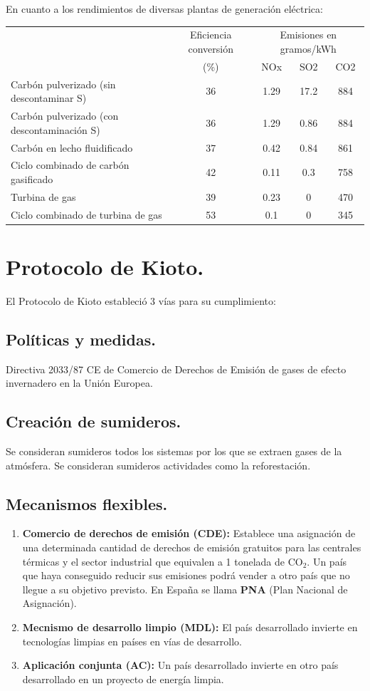 En cuanto a los rendimientos de diversas plantas de generación eléctrica:
\begin{table}[h]
	\label{tab:conversion-efficiency}
	\begin{tabular}{lcccc}
		\toprule
		&Eficiencia conversión&\multicolumn{3}{c}{Emisiones en gramos/kWh} \\
		\cline{3-5}
		&  (\%) & NOx & SO2 & CO2 \\
		\midrule
		Carbón pulverizado (sin descontaminar S) & 36 & 1.29 & 17.2 & 884 \\
		Carbón pulverizado (con descontaminación S) & 36 & 1.29 & 0.86 & 884 \\
		Carbón en lecho fluidificado & 37 & 0.42 & 0.84 & 861 \\
		Ciclo combinado de carbón gasificado & 42 & 0.11 & 0.3 & 758 \\
		Turbina de gas & 39 & 0.23 & 0 & 470 \\
		Ciclo combinado de turbina de gas & 53 & 0.1 & 0 & 345 \\
		\bottomrule
	\end{tabular}
\end{table}
\newpage
\section{Protocolo de Kioto.}
El Protocolo de Kioto estableció 3 vías para su cumplimiento:
\subsection{Políticas y medidas.}
Directiva 2033/87 CE de Comercio de Derechos de Emisión de gases
de efecto invernadero en la Unión Europea.
\subsection{Creación de sumideros.}
Se consideran sumideros todos los sistemas por los que se extraen gases de la atmósfera. Se consideran sumideros actividades como la reforestación.
\subsection{Mecanismos flexibles.}
\begin{enumerate}
	\item \textbf{Comercio de derechos de emisión (CDE):}
		Establece una asignación de una determinada cantidad de derechos de emisión gratuitos para
		las centrales térmicas y el sector industrial que equivalen a 1 tonelada de CO$_2$. Un país que haya conseguido reducir sus emisiones podrá vender a otro país que no llegue a su objetivo previsto. En España se llama \textbf{PNA} (Plan Nacional de Asignación).
	\item \textbf{Mecnismo de desarrollo limpio (MDL):}
		El país desarrollado invierte en tecnologías limpias en países en vías de desarrollo.
	\item \textbf{Aplicación conjunta (AC):}
		Un país desarrollado invierte en otro país desarrollado en un proyecto de energía limpia.
\end{enumerate}
